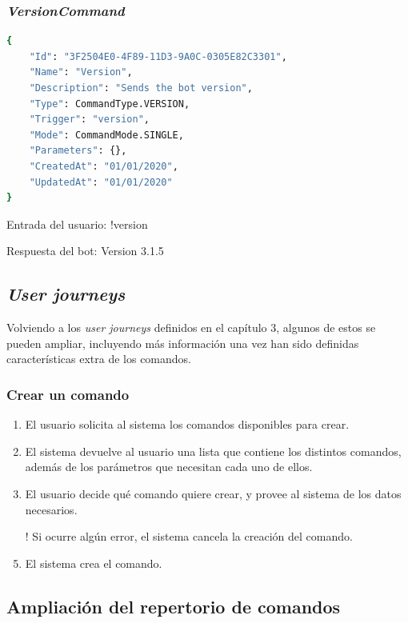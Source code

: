 \subsubsection{\textit{VersionCommand}}

\begin{lstlisting}[language=sh]
{
    "Id": "3F2504E0-4F89-11D3-9A0C-0305E82C3301",
    "Name": "Version",
    "Description": "Sends the bot version",
    "Type": CommandType.VERSION,
    "Trigger": "version",
    "Mode": CommandMode.SINGLE,
    "Parameters": {},
    "CreatedAt": "01/01/2020",
    "UpdatedAt": "01/01/2020"
}
\end{lstlisting}

Entrada del usuario: !version

Respuesta del bot: Version 3.1.5





\subsection{\textit{User journeys}}

Volviendo a los \textit{user journeys} definidos en el capítulo 3, algunos de estos se pueden ampliar, incluyendo más información una vez han sido definidas características extra de los comandos.

\subsubsection{Crear un comando}

\begin{enumerate}
	\item El usuario solicita al sistema los comandos disponibles para crear.
	\item El sistema devuelve al usuario una lista que contiene los distintos comandos, además de los parámetros que necesitan cada uno de ellos.
	\item El usuario decide qué comando quiere crear, y provee al sistema de los datos necesarios.
	\item[!] Si ocurre algún error, el sistema cancela la creación del comando.
	\item El sistema crea el comando.
\end{enumerate}

\subsection{Ampliación del repertorio de comandos}

